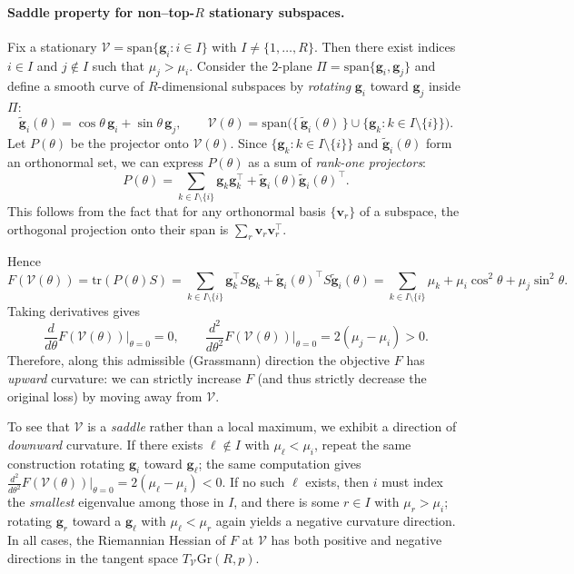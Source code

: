 \documentclass[11pt]{article}
\theoremstyle{spaced}
\begin{document}
\paragraph{Saddle property for non--top-\(R\) stationary subspaces.}
Fix a stationary \(\mathcal{V} = \mathrm{span}\{\mathbf{g}_i : i \in I\}\) with \(I \neq \{1,\ldots,R\}\).
Then there exist indices \(i \in I\) and \(j \notin I\) such that \(\mu_j > \mu_i\).
Consider the \(2\)-plane \(\Pi = \mathrm{span}\{\mathbf{g}_i,\mathbf{g}_j\}\) and define a smooth
curve of \(R\)-dimensional subspaces by \emph{rotating} \(\mathbf{g}_i\) toward \(\mathbf{g}_j\) inside \(\Pi\):
\[
\widetilde{\mathbf{g}}_i(\theta) = \cos\theta\, \mathbf{g}_i + \sin\theta\, \mathbf{g}_j, \qquad
\mathcal{V}(\theta) = \mathrm{span}\bigl(\{\,\widetilde{\mathbf{g}}_i(\theta)\,\} \cup \{\mathbf{g}_k : k \in I \setminus \{i\}\}\bigr).
\]
Let \(P(\theta)\) be the projector onto \(\mathcal{V}(\theta)\). Since
\(\{\mathbf{g}_k : k \in I \setminus \{i\}\}\) and \(\widetilde{\mathbf{g}}_i(\theta)\) form an orthonormal set,
we can express \(P(\theta)\) as a sum of \emph{rank-one projectors}:
\[
P(\theta)
= \sum_{k \in I \setminus \{i\}} \mathbf{g}_k \mathbf{g}_k^\top + \widetilde{\mathbf{g}}_i(\theta)\widetilde{\mathbf{g}}_i(\theta)^\top.
\]
This follows from the fact that for any orthonormal basis \(\{\mathbf{v}_r\}\) of a subspace,
the orthogonal projection onto their span is \(\sum_r \mathbf{v}_r \mathbf{v}_r^\top\).

Hence
\[
F(\mathcal{V}(\theta)) = \mathrm{tr}(P(\theta)S)
= \sum_{k \in I \setminus \{i\}} \mathbf{g}_k^\top S \mathbf{g}_k + \widetilde{\mathbf{g}}_i(\theta)^\top S \widetilde{\mathbf{g}}_i(\theta)
= \sum_{k \in I \setminus \{i\}} \mu_k + \mu_i\cos^2\theta + \mu_j\sin^2\theta.
\]
Taking derivatives gives
\[
\frac{d}{d\theta}F(\mathcal{V}(\theta))\bigg|_{\theta=0} = 0, \qquad
\frac{d^2}{d\theta^2}F(\mathcal{V}(\theta))\bigg|_{\theta=0} = 2(\mu_j - \mu_i) > 0.
\]
Therefore, along this admissible (Grassmann) direction the objective \(F\) has
\emph{upward} curvature: we can strictly increase \(F\) (and thus strictly decrease
the original loss) by moving away from \(\mathcal{V}\).

To see that \(\mathcal{V}\) is a \emph{saddle} rather than a local maximum, we
exhibit a direction of \emph{downward} curvature. If there exists \(\ell \notin I\)
with \(\mu_\ell < \mu_i\), repeat the same construction rotating \(\mathbf{g}_i\)
toward \(\mathbf{g}_\ell\); the same computation gives
\(\tfrac{d^2}{d\theta^2}F(\mathcal{V}(\theta))|_{\theta=0} = 2(\mu_\ell - \mu_i) < 0\).
If no such \(\ell\) exists, then \(i\) must index the \emph{smallest} eigenvalue among
those in \(I\), and there is some \(r \in I\) with \(\mu_r > \mu_i\); rotating \(\mathbf{g}_r\)
toward a \(\mathbf{g}_\ell\) with \(\mu_\ell < \mu_r\) again yields a negative curvature
direction. In all cases, the Riemannian Hessian of \(F\) at \(\mathcal{V}\) has both
positive and negative directions in the tangent space \(T_{\mathcal{V}}\mathrm{Gr}(R,p)\).
\end{document}
